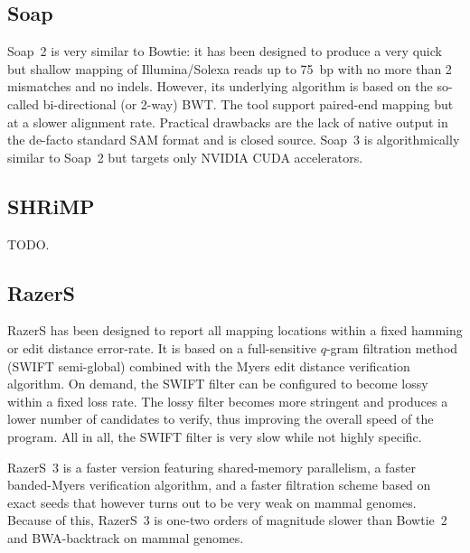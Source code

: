 
\subsection{Soap}

Soap~2 \citep{Soap2} is very similar to Bowtie: it has been designed to produce a very quick but shallow mapping of Illumina/Solexa reads up to 75~bp with no more than 2 mismatches and no indels.
However, its underlying algorithm is based on the so-called bi-directional (or 2-way) BWT.
The tool support paired-end mapping but at a slower alignment rate.
Practical drawbacks are the lack of native output in the de-facto standard SAM format and is closed source.
Soap~3 \citep{Soap3} is algorithmically similar to Soap~2 but targets only NVIDIA CUDA accelerators.


\subsection{SHRiMP}

TODO.


\subsection{RazerS}

RazerS \citep{Weese2009} has been designed to report all mapping locations within a fixed hamming or edit distance error-rate.
It is based on a full-sensitive $q$-gram filtration method (SWIFT semi-global) combined with the Myers edit distance verification algorithm.
On demand, the SWIFT filter can be configured to become lossy within a fixed loss rate.
The lossy filter becomes more stringent and produces a lower number of candidates to verify, thus improving the overall speed of the program.
All in all, the SWIFT filter is very slow while not highly specific.

RazerS~3 \citep{RazerS3} is a faster version featuring shared-memory parallelism, a faster banded-Myers verification algorithm, and a faster filtration scheme based on exact seeds that however turns out to be very weak on mammal genomes.
Because of this, RazerS~3 is one-two orders of magnitude slower than Bowtie~2 and BWA-backtrack on mammal genomes.

